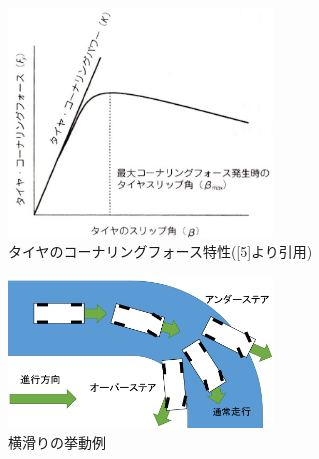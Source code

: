 \documentclass[twocolumn]{jsarticle}
\begin{document}
\begin{figure}[H]
	\centering
	\includegraphics[width=7cm]{kf.jpg}
	\caption{タイヤのコーナリングフォース特性([5]より引用)}
	\label{fig05}
\end{figure}
\begin{figure}[H]
	\centering
	\includegraphics[width=7cm]{slip.jpg}
	\caption{横滑りの挙動例}
	\label{fig06}
\end{figure}
\end{document}

